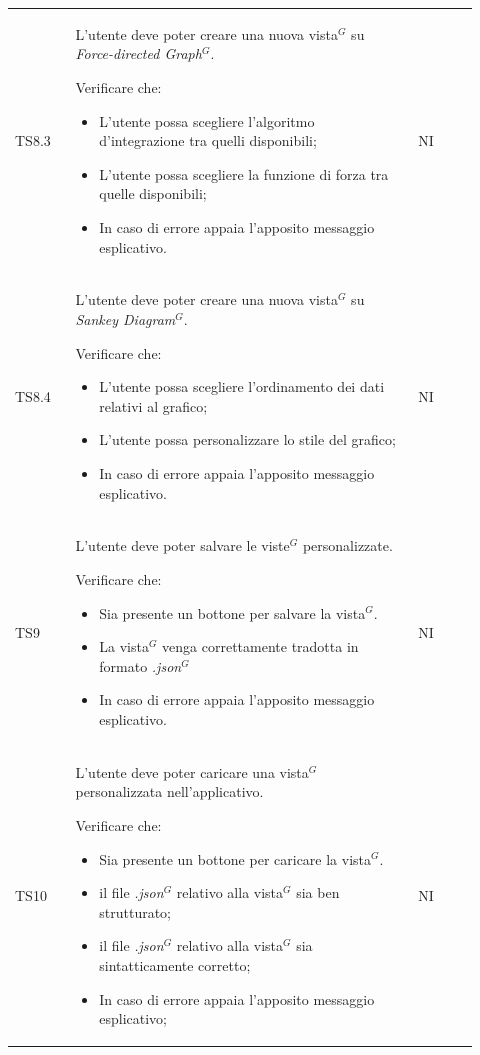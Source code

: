 \begin{longtable}{p{0.12\linewidth}p{0.68\linewidth}p{0.12\linewidth}}
    \rowcolor[RGB]{233, 245, 206}
    TS8.3 &
    L'utente deve poter creare una nuova vista$^{G}$ su \textit{Force-directed Graph}$^{G}$. \par
    Verificare che:
    \begin{itemize}
        \item L'utente possa scegliere l'algoritmo d'integrazione tra quelli disponibili;
        \item L'utente possa scegliere la funzione di forza tra quelle disponibili;
        \item In caso di errore appaia l’apposito messaggio esplicativo.
    \end{itemize}&
    NI \\

    \rowcolor[RGB]{216, 235, 171}
    TS8.4 &
    L'utente deve poter creare una nuova vista$^{G}$ su \textit{Sankey Diagram}$^{G}$. \par
    Verificare che:
    \begin{itemize}
        \item L'utente possa scegliere l'ordinamento dei dati relativi al grafico;
        \item L'utente possa personalizzare lo stile del grafico;
        \item In caso di errore appaia l'apposito messaggio esplicativo.
    \end{itemize}&
    NI \\

    \rowcolor[RGB]{233, 245, 206}
    TS9 &
    L'utente deve poter salvare le viste$^{G}$ personalizzate. \par
    Verificare che:
    \begin{itemize}
        \item Sia presente un bottone per salvare la vista$^{G}$.
        \item La vista$^{G}$ venga correttamente tradotta in formato \textit{.json}$^{G}$
        \item In caso di errore appaia l'apposito messaggio esplicativo.
    \end{itemize}&
    NI \\

    \rowcolor[RGB]{216, 235, 171}
    TS10 &
    L'utente deve poter caricare una vista$^{G}$ personalizzata nell'applicativo. \par
    Verificare che:
    \begin{itemize}
        \item Sia presente un bottone per caricare la vista$^{G}$.
        \item il file \textit{.json}$^{G}$ relativo alla vista$^{G}$ sia ben strutturato;
        \item il file \textit{.json}$^{G}$ relativo alla vista$^{G}$ sia sintatticamente corretto;
        \item In caso di errore appaia l'apposito messaggio esplicativo;
    \end{itemize}&
    NI \\


\end{longtable}

